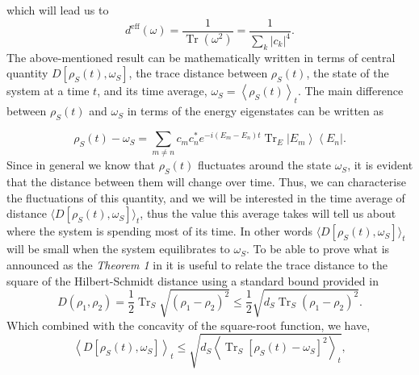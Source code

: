 which will lead us to 
\begin{equation}
d^{\mathrm{eff}}(\omega)=\frac{1}{\operatorname{Tr}\left(\omega^{2}\right)}=\frac{1}{\sum_{k}\left|c_{k}\right|^{4}}.
\label{CH1:expansion_4}
\end{equation}
\indent The above-mentioned result can be mathematically written in terms of central quantity $D\left[\rho_{S}(t), \omega_{S}\right]$, the trace distance between $\rho_S(t)$, the state of the system at a time $t$, and its time average, $\omega_{S}=\left\langle\rho_{S}(t)\right\rangle_{t}$. The main difference between $\rho_S(t)$ and $\omega_{S}$ in terms of the energy eigenstates can be written as

\begin{equation}
\rho_{S}(t)-\omega_{S}=\sum_{m \neq n} c_{m} c_{n}^{*} e^{-i\left(E_{m}-E_{n}\right) t} \operatorname{Tr}_{E}\left|E_{m}\right\rangle\left\langle E_{n}\right|.
\label{CH1:expansion_5}
\end{equation}
\indent Since in general we know that $\rho_S(t)$ fluctuates around the state $\omega_S$, it is evident that the distance between them will change over time. Thus, we can characterise the fluctuations of this quantity, and we will be interested in the time average of distance $\langle D\left[\rho_{S}(t), \omega_{S}\right]\rangle_t$, thus the value this average takes will tell us about where the system is spending most of its time. In other words $\langle D\left[\rho_{S}(t), \omega_{S}\right]\rangle_t$ will be small when the system equilibrates to $\omega_S$. To be able to prove what is announced as the \textit{Theorem 1} in \cite{linden_quantum_2009} it is useful to relate the trace distance to the square of the Hilbert-Schmidt distance using a standard bound provided in \cite{fuchs_cryptographic_1999}
\begin{equation}
D\left(\rho_{1}, \rho_{2}\right)=\frac{1}{2} \operatorname{Tr}_{S} \sqrt{\left(\rho_{1}-\rho_{2}\right)^{2}} \leq \frac{1}{2} \sqrt{d_{S} \operatorname{Tr}_{S}\left(\rho_{1}-\rho_{2}\right)^{2}}.
\label{CH1:Linden_proof_1}
\end{equation}
Which combined with the concavity of the square-root function, we have,
\begin{equation}
\left\langle D\left[\rho_{S}(t), \omega_{S}\right]\right\rangle_{t} \leq \sqrt{d_{S}\left\langle\operatorname{Tr}_{S}\left[\rho_{S}(t)-\omega_{S}\right]^{2}\right\rangle_{t}},
\label{CH1:Linden_proof_2}
\end{equation}
